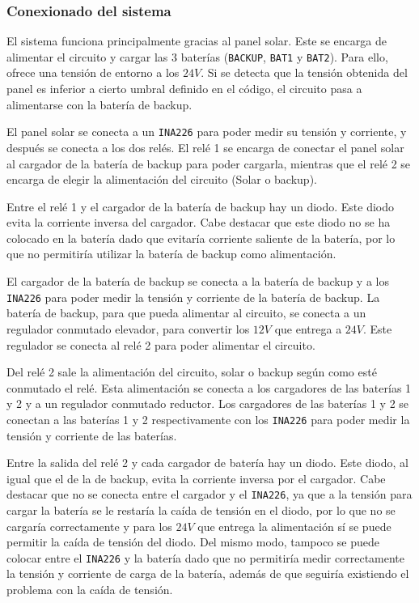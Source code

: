 \subsubsection{Conexionado del sistema}\label{subsec:conexionado}

El sistema funciona principalmente gracias al panel solar. Este se encarga de alimentar el circuito y cargar las 3 baterías (\texttt{BACKUP}, \texttt{BAT1} y \texttt{BAT2}). Para ello, ofrece una tensión de entorno a los $24 V$. Si se detecta que la tensión obtenida del panel es inferior a cierto umbral definido en el código, el circuito pasa a alimentarse con la batería de backup.

El panel solar se conecta a un \texttt{INA226} para poder medir su tensión y corriente, y después se conecta a los dos relés. El relé 1 se encarga de conectar el panel solar al cargador de la batería de backup para poder cargarla, mientras que el relé 2 se encarga de elegir la alimentación del circuito (Solar o backup).

Entre el relé 1 y el cargador de la batería de backup hay un diodo. Este diodo evita la corriente inversa del cargador. Cabe destacar que este diodo no se ha colocado en la batería dado que evitaría corriente saliente de la batería, por lo que no permitiría utilizar la batería de backup como alimentación.

El cargador de la batería de backup se conecta a la batería de backup y a los \texttt{INA226} para poder medir la tensión y corriente de la batería de backup. La batería de backup, para que pueda alimentar al circuito, se conecta a un regulador conmutado elevador, para convertir los $12 V$ que entrega a $24 V$. Este regulador se conecta al relé 2 para poder alimentar el circuito.

Del relé 2 sale la alimentación del circuito, solar o backup según como esté conmutado el relé. Esta alimentación se conecta a los cargadores de las baterías 1 y 2 y a un regulador conmutado reductor. Los cargadores de las baterías 1 y 2 se conectan a las baterías 1 y 2 respectivamente con los \texttt{INA226} para poder medir la tensión y corriente de las baterías.

Entre la salida del relé 2 y cada cargador de batería hay un diodo. Este diodo, al igual que el de la de backup, evita la corriente inversa por el cargador. Cabe destacar que no se conecta entre el cargador y el \texttt{INA226}, ya que a la tensión para cargar la batería se le restaría la caída de tensión en el diodo, por lo que no se cargaría correctamente y para los $24 V$ que entrega la alimentación sí se puede permitir la caída de tensión del diodo. Del mismo modo, tampoco se puede colocar entre el \texttt{INA226} y la batería dado que no permitiría medir correctamente la tensión y corriente de carga de la batería, además de que seguiría existiendo el problema con la caída de tensión.

